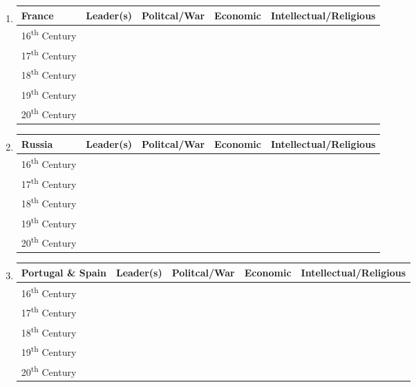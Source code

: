 \documentclass[12pt]{article}
\begin{document}
\begin{enumerate}
\begin{tabular}{l c c c c}
\end{tabular}

\item \begin{tabular}{l c c c c}

France & Leader(s) & Politcal/War & Economic & Intellectual/Religious \\
\hline
16\textsuperscript{th} Century & & & & \\
\hline
17\textsuperscript{th} Century & & & & \\
\hline
18\textsuperscript{th} Century & & & & \\
\hline
19\textsuperscript{th} Century & & & & \\
\hline
20\textsuperscript{th} Century & & & & \\

\end{tabular}

\item \begin{tabular}{l c c c c}

Russia & Leader(s) & Politcal/War & Economic & Intellectual/Religious \\
\hline
16\textsuperscript{th} Century & & & & \\
\hline
17\textsuperscript{th} Century & & & & \\
\hline
18\textsuperscript{th} Century & & & & \\
\hline
19\textsuperscript{th} Century & & & & \\
\hline
20\textsuperscript{th} Century & & & & \\

\end{tabular}

\item \begin{tabular}{l c c c c}

Portugal \& Spain & Leader(s) & Politcal/War & Economic & Intellectual/Religious \\
\hline
16\textsuperscript{th} Century & & & & \\
\hline
17\textsuperscript{th} Century & & & & \\
\hline
18\textsuperscript{th} Century & & & & \\
\hline
19\textsuperscript{th} Century & & & & \\
\hline
20\textsuperscript{th} Century & & & & \\

\end{tabular}


\end{enumerate}
\end{document}
